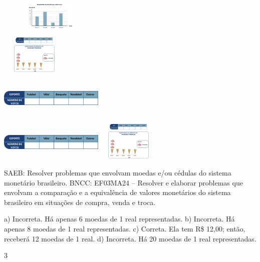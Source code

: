 {\begin{escolha}
\begin{escolha}

\item
\includegraphics[width=1.93350in,height=0.50004in]{media/image83.png}

\item
\includegraphics[width=1.26678in,height=0.72506in]{media/image84.png}

\item
\includegraphics[width=1.95850in,height=0.69173in]{media/image85.png}

\item
\includegraphics[width=1.95850in,height=0.69173in]{media/image85.png}\includegraphics[width=1.26678in,height=0.72506in]{media/image84.png}
\end{escolha}

SAEB: Resolver problemas que envolvam moedas e/ou cédulas do sistema monetário brasileiro. 
BNCC: EF03MA24 -- Resolver e elaborar problemas que envolvam a comparação e a equivalência de
valores monetários do sistema brasileiro em situações de compra, venda e troca.

a) Incorreta. Há apenas 6 moedas de 1 real representadas.
b) Incorreta. Há apenas 8 moedas de 1 real representadas.
c) Correta. Ela tem R\$ 12,00; então, receberá 12 moedas de 1 real.
d) Incorreta. Há 20 moedas de 1 real representadas.

\num{3}


\end{escolha}}
